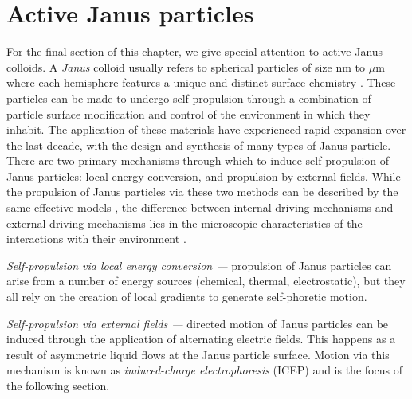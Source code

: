 % 


\section{Active Janus particles}
\label{section:activeMatter:janus}

For the final section of this chapter, we give special attention to active Janus colloids. A \textit{Janus} colloid usually refers to spherical particles of size nm to $\mu$m where each hemisphere features a unique and distinct surface chemistry \cite{zhang2017}. These particles can be made to undergo self-propulsion through a combination of particle surface modification and  control of the environment in which they inhabit. The application of these materials have experienced rapid expansion over the last decade, with the design and synthesis of many types of Janus particle. There are two primary mechanisms through which to induce self-propulsion of Janus particles: local energy conversion, and propulsion by external fields. While the propulsion of Janus particles via these two methods can be described by the same effective models \cite{bechinger2016a}, the difference between internal driving mechanisms and external driving mechanisms lies in the microscopic characteristics of the interactions with their environment \cite{bechinger2016a}.

\textit{Self-propulsion via local energy conversion ---} propulsion of Janus particles can arise from a number of energy sources (chemical, thermal, electrostatic), but they all rely on the creation of local gradients to generate self-phoretic motion.

\textit{Self-propulsion via external fields ---} directed motion of Janus particles can be induced through the application of alternating electric fields. This happens as a result of asymmetric liquid flows at the Janus particle surface. Motion via this mechanism is known as \textit{induced-charge electrophoresis} (ICEP) \cite{gangwal2008} and is the focus of the following section.

